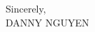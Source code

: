 \documentclass[letterpaper,11pt]{article}
\begin{document}
\vspace{20pt}

Sincerely, \\
\vspace{40pt} %
DANNY NGUYEN

\end{document}
